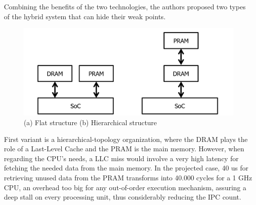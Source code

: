 \documentclass[12pt,journal,compsoc]{IEEEtran}
\begin{document}
Combining the benefits of the two technologies, the authors proposed two types of the hybrid system that can hide their weak points. 
\begin{figure}
	\centering
	\includegraphics[width = 8 cm]{graphics/structure-hybrid.png}
	\caption{(a) Flat structure (b) Hierarchical structure}\label{fig:structure}
\end{figure} 
First variant is a hierarchical-topology organization, where the DRAM plays the role of a Last-Level Cache and the PRAM is the main memory. However, when regarding the CPU’s needs, a LLC miss would involve a very high latency for fetching the needed data from the main memory. In the projected case, 40 us for retrieving unused data from the PRAM transforms into 40.000 cycles for a 1 GHz CPU, an overhead too big for any out-of-order execution mechanism, assuring a deep stall on every processing unit, thus considerably reducing the IPC count.
\end{document}
